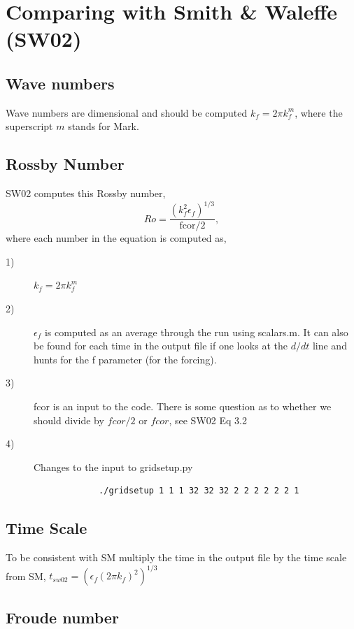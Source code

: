 \documentclass[12pt]{article}
\begin{document}
\section{Comparing with Smith \& Waleffe (SW02)}

\subsection*{Wave numbers}
Wave numbers are dimensional and should be computed $k_f = 2 \pi
k_f^m$, where the superscript $m$ stands for Mark. 

\subsection*{Rossby Number}
SW02 computes this Rossby number,
\begin{equation}
  Ro = \frac{(k_f^2 \epsilon_f)^{1/3}}{\text{fcor}/2}, 
\end{equation}
where each number in the equation is computed as,
\begin{description}
   \item[1)] $k_f = 2 \pi k_f^m$
   \item[2)] $\epsilon_f$ is computed as an average through the run using
     scalars.m. It can also be found for each time in the output file
     if one looks at the $d/dt$ line and hunts for the f parameter (for
     the forcing).
  \item[3)] fcor is an input to the code. There is some question as to
    whether we should divide by $fcor/2$ or $fcor$, see SW02 Eq 3.2
  \item[4)] Changes to the input to gridsetup.py\\
            \begin{verbatim}
             ./gridsetup 1 1 1 32 32 32 2 2 2 2 2 2 1
            \end{verbatim}
\end{description}

\subsection*{Time Scale}
To be consistent with SM multiply the time in the output file by the
time scale from SM, $t_{sw02} = (\epsilon_f (2 \pi k_f)^2)^{1/3}$

\subsection*{Froude number}
\end{document}
